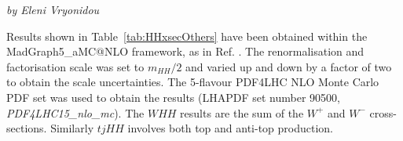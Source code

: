 \begin{center}
    \textit{by Eleni Vryonidou}
\end{center}

\begin{table}[h!]
\renewcommand{\arraystretch}{1.6}
\begin{center}
\end{center} 
\caption{Signal cross section (in fb) for HH production at NLO QCD.}  
\label{tab:HHxsecOthers}
\end{table}
Results  shown in Table~\ref{tab:HHxsecOthers} have been obtained within the {\sc MadGraph5\_aMC@NLO} \cite{Alwall:2014hca} framework, as in Ref. \cite{Frederix:2014hta}. The renormalisation and factorisation scale was set to $m_{HH}/2$ and varied up and down by a factor of two to obtain the scale uncertainties. The 5-flavour PDF4LHC NLO Monte Carlo PDF set was used to obtain the results (LHAPDF set number 90500, \textit {PDF4LHC15\_nlo\_mc}). The $WHH$ results are the sum of the $W^+$ and $W^-$ cross-sections. Similarly $tjHH$ involves both top and anti-top production. 
